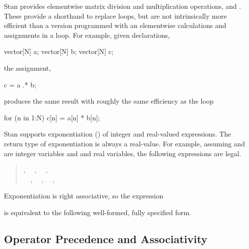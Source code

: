 Stan provides elementwise matrix division and multiplication
operations,  and .  These provide a shorthand
to replace loops, but are not intrinsically more efficient than a
version programmed with an elementwise calculations and assignments in
a loop.  For example, given declarations,
%
\begin{stancode}
vector[N] a;
vector[N] b;
vector[N] c;
\end{stancode}
%
the assignment,
%
\begin{stancode}
c = a .* b;
\end{stancode}
%
produces the same result with roughly the same efficiency as the loop
%
\begin{stancode}
for (n in 1:N)
  c[n] = a[n] * b[n];
\end{stancode}

Stan supports exponentiation (\code{\textasciicircum}) of integer and
real-valued expressions.  The return type of exponentiation is always
a real-value.  For example, assuming  and  are integer
variables and  and  real variables, the following
expressions are legal.
%
\begin{quote}
,
\ \ ,
\ \ ,
\\
\ \ ,
\ \ ,
\ \ ,
\ \ 
\end{quote}
%
Exponentiation is right associative, so the expression
%
\begin{quote}
\end{quote}
%
is equivalent to the following well-formed, fully specified form.
%
\begin{quote}
\end{quote}
%



\subsection{Operator Precedence and Associativity}

